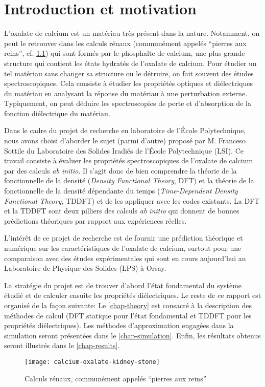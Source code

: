 \chapter{Introduction et motivation}
\label{chap-intro}
L'oxalate de calcium est un matériau très présent dans la nature.
Notamment, on peut le retrouver dans les calculs rénaux
(communément appelés ``pierres aux reins'', cf. \cref{fig-calcul})
qui sont formés par le phosphalte de calcium,
une plus grande structure qui contient les états hydratés de l'oxalate de calcium.
Pour étudier un tel matériau sans changer sa structure ou le détruire,
on fait souvent des études spectroscopiques.
Cela consiste à étudier les propriétés optiques et diélectriques du matériau en
analysant la réponse du matériau à une perturbation externe.
Typiquement, on peut déduire les spectroscopies de perte et d'absorption
de la fonction diélectrique du matériau.

Dans le cadre du projet de recherche en laboratoire de l'École Polytechnique,
nous avons choisi d'aborder le sujet (parmi d'autre) proposé par M. Franceso Sottile
du Laboratoire des Solides Iradiés de l'École Polytechnique (LSI).
Ce travail consiste à évaluer les propriétés spectroscopiques de l'oxalate de calcium par des calculs \textit{ab initio}.
Il s'agit donc de bien comprendre la théorie de la fonctionnelle de la densité
(\textit{Density Functional Theory}, DFT)
et la théorie de la fonctionnelle de la densité dépendante du temps
(\textit{Time-Dependent Density Functional Theory}, TDDFT)
et de les appliquer avec les codes existants.
La DFT et la TDDFT sont deux pilliers des calculs \textit{ab initio}
qui donnent de bonnes prédictions théoriques par rapport aux expériences réelles.

L'intérêt de ce projet de recherche est de fournir une prédiction théorique et numérique
sur les caractéristiques de l'oxalate de calcium,
surtout pour une comparaison avec des études expérimentales qui sont en cours aujourd'hui
au Laboratoire de Physique des Solides (LPS) à Orsay.

La stratégie du projet est de trouver d'abord l'état fondamental du système étudié
et de calculer ensuite les propriétés diélectriques.
Le reste de ce rapport est organisé de la façon suivante:
Le \cref{chap-theory} est consacré à la description des méthodes de calcul
(DFT statique pour l'état fondamental et TDDFT pour les propriétés diélectriques).
Les méthodes d'approximation engagées dans la simulation seront présentées dans le \cref{chap-simulation}.
Enfin, les résultats obtenus seront illustrés dans le \cref{chap-results}.
\begin{figure}[h!]
  \vspace{6pt}
  \centering
  \texttt{[image: calcium-oxalate-kidney-stone]}
  \caption{Calculs rénaux, communément appelés ``pierres aux reins''}\label{fig-calcul}
\end{figure}
